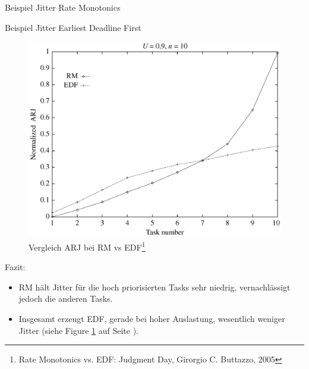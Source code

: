 \begin{frame}{Beispiel Jitter Rate Monotonics}
	
\end{frame}

\begin{frame}{Beispiel Jitter Earliest Deadline First}
	
\end{frame}

\begin{frame}{\subsecname}
	\begin{figure}[htbp]
		\begin{center}
			\includegraphics[scale=.30]{graphics/vergleich/jitter.png}
		\end{center}
		\caption{Vergleich ARJ bei RM vs EDF\footnote{Rate Monotonics vs. EDF: Judgment Day, Girorgio C. Buttazzo, 2005}}
		\label{fig:jitter}
	\end{figure}
	
\end{frame}

\begin{frame}{Fazit:}
	\begin{itemize}
		\item RM hält Jitter für die hoch priorisierten Tasks sehr niedrig, vernachlässigt jedoch die anderen Tasks.
		\item Insgesamt erzeugt EDF, gerade bei hoher Auslastung, wesentlich weniger Jitter (siehe Figure \ref{fig:jitter} auf Seite \pageref{fig:jitter}).
	\end{itemize}
\end{frame}

%
